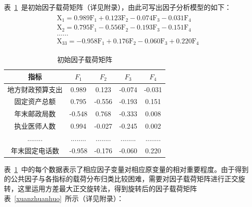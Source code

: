 \documentclass{whutmod}
\begin{document}
	表~\ref{cehngfenjuzheng}~是初始因子载荷矩阵（详见附录），由此可写出因子分析模型的如下：
	\begin{gather}
	\begin{array} { l } { \mathrm { X } _ { 1 } = 0.989 \mathrm { F } _ { 1 } + 0.123 \mathrm { F } _ { 2 } - 0.074 \mathrm { F } _ { 3 } - 0.031 \mathrm { F } _ { 4 } } \\ { \mathrm { X } _ { 2 } = 0.795 \mathrm { F } _ { 1 } - 0.556 \mathrm { F } _ { 2 } - 0.193 \mathrm { F } _ { 3 } - 0.151 \mathrm { F } _ { 4 } } \\ { \ldots \ldots } \\ { \mathrm { X } _ { 33 } = - 0.958 \mathrm { F } _ { 1 } + 0.176 \mathrm { F } _ { 2 } - 0.060 \mathrm { F } _ { 3 } + 0.220 \mathrm { F } _ { 4 } } \end{array}
	\end{gather}
			\begin{table}[H]
	\centering
	\caption{初始因子载荷矩阵}\label{cehngfenjuzheng}
	\begin{tabular}{ccccc}
		\toprule[2pt]
		\multicolumn{1}{m{2cm}}{\centering 指标} &
		\multicolumn{1}{m{1cm}}{\centering $F_{1}$} & \multicolumn{1}{m{1cm}}{\centering $F_{2}$} & \multicolumn{1}{m{1cm}}{\centering $F_{3}$}&
		\multicolumn{1}{m{1cm}}{\centering $F_{4}$}\\
		\midrule[1pt]
		地方财政预算支出&0.989	 & 0.123 & -0.074&-0.031\\ 
		固定资产总额&0.795 &-0.556 &-0.193&0.151\\ 
		年末邮政局数&-0.548 &0.768  &-0.333&0.008\\ 
		执业医师人数&0.994 &-0.027 &-0.245 &0.002\\ 
		........& ........&  ........ &........ &........ \\ 
		年末固定电话数&-0.958 &-0.176   &-0.060 &0.220 \\
		\bottomrule[2pt]
	\end{tabular}
\end{table}
		表~\ref{cehngfenjuzheng}~中的每个数据表示了相应因子变量对相应原变量的相对重要程度。由于得到的公共因子与各指标的载荷分布归类比较困难，需要对因子载荷矩阵进行正交旋转，这里运用方差最大正交旋转法\parencite{宋鸿2010城市人才吸引力的影响因素及提升对策}，得到旋转后的因子载荷矩阵表~\ref{xuanzhuanhuo}~所示（详见附录）：
\end{document}
